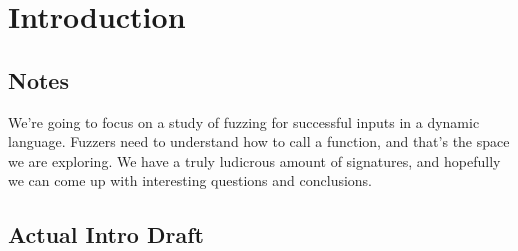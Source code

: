 \section{Introduction}

\subsection{Notes}

We're going to focus on a study of fuzzing for successful inputs in a dynamic language.
Fuzzers need to understand how to call a function, and that's the space we are exploring.
We have a truly ludicrous amount of signatures, and hopefully we can come up with interesting questions and conclusions.

\subsection{Actual Intro Draft}

